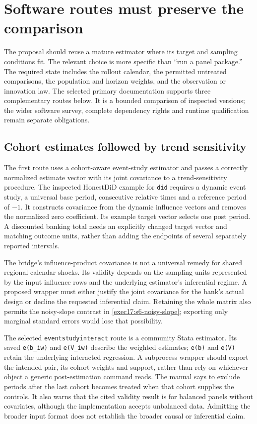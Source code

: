 \section{Software routes must preserve the comparison}
\label{exec17:s6-software}

The proposal should reuse a mature estimator where its target and
sampling conditions fit. The relevant choice is more specific than
``run a panel package.'' The required state includes the rollout
calendar, the permitted untreated comparisons, the population and
horizon weights, and the observation or innovation law. The selected
primary documentation supports three complementary routes below.
It is a bounded comparison of inspected versions; the wider software
survey, complete dependency rights and runtime qualification remain
separate obligations.~\citep{exec17_s6_paths}

\subsection{Cohort estimates followed by trend sensitivity}

The first route uses a cohort-aware event-study estimator and passes
a correctly normalized estimate vector with its joint covariance to
a trend-sensitivity procedure. The inspected HonestDiD example for
\texttt{did} requires a dynamic event study, a universal base period,
consecutive relative times and a reference period of $-1$. It
constructs covariance from the dynamic influence vectors and removes
the normalized zero coefficient. Its example target vector selects
one post period. A discounted banking total needs an explicitly
changed target vector and matching outcome units, rather than adding
the endpoints of several separately reported intervals.
\citep{sw_honestdid,exec17_s6_paths}

The bridge's influence-product covariance is not a universal remedy
for shared regional calendar shocks. Its validity depends on the
sampling units represented by the input influence rows and the
underlying estimator's inferential regime. A proposed wrapper must
either justify the joint covariance for the bank's actual design or
decline the requested inferential claim. Retaining the whole matrix
also permits the noisy-slope contrast in
\eqref{exec17:s6-noisy-slope}; exporting only marginal standard
errors would lose that possibility.

The selected \texttt{eventstudyinteract} route is a community Stata
estimator. Its saved \texttt{e(b\_iw)} and \texttt{e(V\_iw)} describe
the weighted estimates; \texttt{e(b)} and \texttt{e(V)} retain the
underlying interacted regression. A subprocess wrapper should export
the intended pair, its cohort weights and support, rather than rely
on whichever object a generic post-estimation command reads. The
manual says to exclude periods after the last cohort becomes treated
when that cohort supplies the controls. It also warns that the cited
validity result is for balanced panels without covariates, although
the implementation accepts unbalanced data. Admitting the broader
input format does not establish the broader causal or inferential
claim.~\citep{v12_sw_eventstudyinteract}

